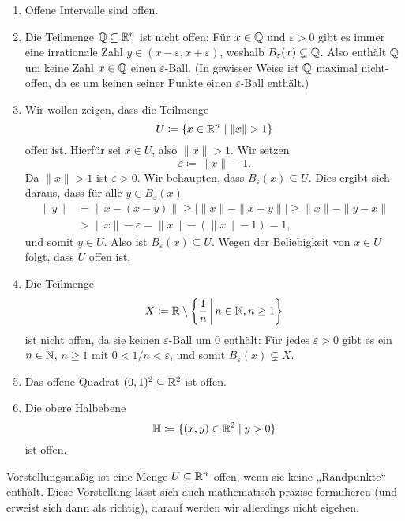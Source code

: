 \documentclass[a4paper,10pt]{article}
\begin{document}
\begin{bsp}
 \begin{enumerate}
  \item
   Offene Intervalle sind offen.
  \item
   Die Teilmenge $\mathbb{Q} \subseteq \mathbb{R}^n$ ist nicht offen: Für $x \in \mathbb{Q}$ und $\varepsilon > 0$ gibt es immer eine irrationale Zahl $y \in (x-\varepsilon, x+\varepsilon)$, weshalb $B_\varepsilon(x) \subsetneq \mathbb{Q}$. Also enthält $\mathbb{Q}$ um keine Zahl $x \in \mathbb{Q}$ einen $\varepsilon$-Ball. (In gewisser Weise ist $\mathbb{Q}$ maximal nicht-offen, da es um keinen seiner Punkte einen $\varepsilon$-Ball enthält.)
  \item
   Wir wollen zeigen, dass die Teilmenge
   \[
    U \coloneqq \{x \in \mathbb{R}^n \mid \|x\| > 1\}
   \]
   offen ist. Hierfür sei $x \in U$, also $\|x\| > 1$. Wir setzen
   \[
    \varepsilon \coloneqq \|x\|-1.
   \]
   Da $\|x\| > 1$ ist $\varepsilon > 0$. Wir behaupten, dass $B_\varepsilon(x) \subseteq U$. Dies ergibt sich daraus, dass für alle $y \in B_\varepsilon(x)$
   \begin{align*}
    \|y\|
    &= \|x - (x - y)\|
    \geq |\|x\| - \|x-y\||
    \geq \|x\| - \|y-x\| \\
    &> \|x\| - \varepsilon 
    = \|x\| - (\|x\| - 1)
    = 1,
   \end{align*}
   und somit $y \in U$. Also ist $B_\varepsilon(x) \subseteq U$. Wegen der Beliebigkeit von $x \in U$ folgt, dass $U$ offen ist.
  \item
   Die Teilmenge
   \[
    X \coloneqq \mathbb{R} \setminus \left\{ \frac{1}{n} \,\middle|\, n \in \mathbb{N}, n \geq 1 \right\}
   \]
   ist nicht offen, da sie keinen $\varepsilon$-Ball um $0$ enthält: Für jedes $\varepsilon > 0$ gibt es ein $n \in \mathbb{N}$, $n \geq 1$ mit $0 < 1/n < \varepsilon$, und somit $B_\varepsilon(x) \subsetneq X$.
  \item
   Das offene Quadrat $(0,1)^2 \subseteq \mathbb{R}^2$ ist offen.
  \item
   Die obere Halbebene
   \[
    \mathbb{H} \coloneqq \{(x,y) \in \mathbb{R}^2 \mid y > 0\}
   \]
   ist offen.
 \end{enumerate}
\end{bsp}


Vorstellungsmäßig ist eine Menge $U \subseteq \mathbb{R}^n$ offen, wenn sie keine „Randpunkte“ enthält. Diese Vorstellung lässt sich auch mathematisch präzise formulieren (und erweist sich dann als richtig), darauf werden wir allerdings nicht eigehen.
\end{document}
